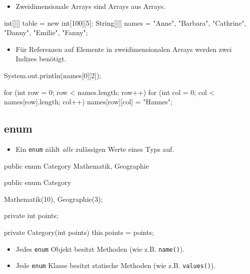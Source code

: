 \documentclass[a4paper,10pt, dvipsnames]{report}
\begin{document}
\begin{itemize}
	\item Zweidimensionale Arrays sind Arrays aus Arrays.
\end{itemize}

\begin{javacodebox}
int[][] table = new int[100][5];
String[][] names = {{"Anne", "Barbara", "Cathrine"}, {"Danny", "Emilie", "Fanny"}};
\end{javacodebox}

\begin{itemize}
	\item Für Referenzen auf Elemente in zweidimensionalen Arrays werden zwei Indizes benötigt.
\end{itemize}

\begin{javacodebox}
System.out.println(names[0][2]);

for (int row = 0; row < names.length; row++) {
	for (int col = 0; col < names[row].length; col++) {
		names[row][col] = "Hannes";
	}
}
\end{javacodebox}

\subsection{enum}

\begin{itemize}
	\item Ein \texttt{enum} zählt \textit{alle} zulässigen Werte eines Typs auf.
\end{itemize}

\begin{javacodebox}
public enum Category {
	Mathematik, Geographie
}
\end{javacodebox}

\begin{javacodebox}
public enum Category {
	Mathematik(10), Geographie(3);

	private int points;

	private Category(int points) {
		this.points = points;
	}
}
\end{javacodebox}

\begin{itemize}
	\item Jedes \texttt{enum} Objekt besitzt Methoden (wie z.B. \texttt{name()}).
	\item Jede \texttt{enum} Klasse besitzt statische Methoden (wie z.B. \texttt{values()}).
\end{itemize}
\end{document}
